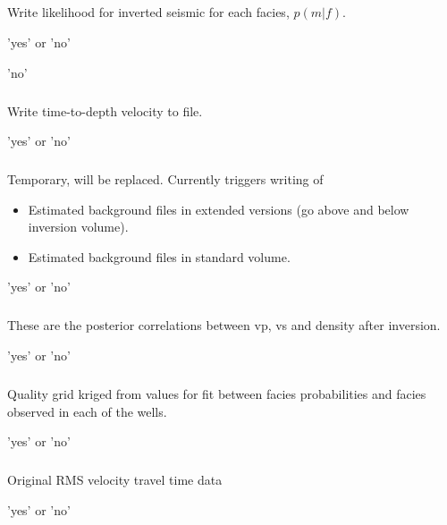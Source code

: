 \subparagraph{}
 \slist
   \item \Description Write likelihood for inverted seismic for each
     facies, $p(m|f)$.
   \item \Argument 'yes' or 'no'
   \item \Default 'no'
 \elist

\subparagraph{}
 \slist
   \item \Description Write time-to-depth velocity to file.
   \item \Argument 'yes' or 'no'
   \item \Default
 \elist

\subparagraph{}
 \slist
   \item \Description Temporary, will be replaced. Currently triggers writing of
   \begin{itemize}
   \item Estimated background files in extended versions (go above and below inversion volume).
   \item Estimated background files in standard volume.
   \end{itemize}
   \item \Argument 'yes' or 'no'
   \item \Default
\elist

\subparagraph{}
 \slist
   \item \Description These are the posterior correlations between vp, vs and density after inversion.
   \item \Argument 'yes' or 'no'
   \item \Default
\elist

\subparagraph{}
 \slist
   \item \Description Quality grid kriged from values for fit between facies probabilities and facies observed in each of the wells.
   \item \Argument 'yes' or 'no'
   \item \Default
\elist

\subparagraph{}
 \slist
   \item \Description Original RMS velocity travel time data
   \item \Argument 'yes' or 'no'
   \item \Default
\elist

